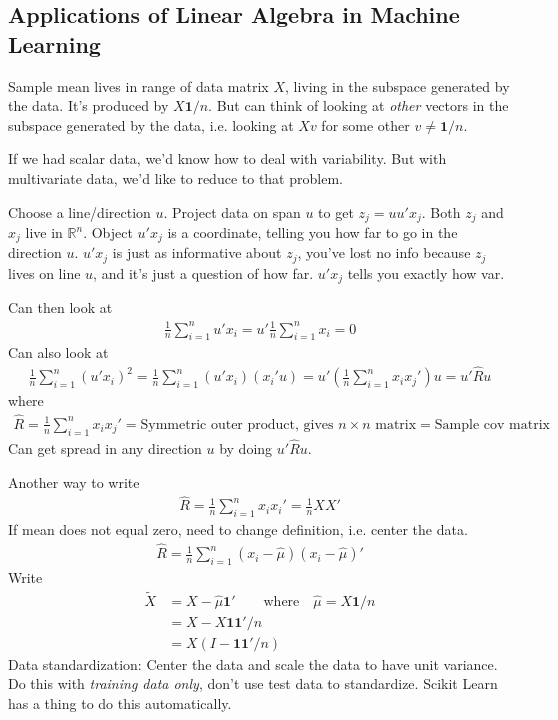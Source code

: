 \documentclass[12pt]{book}
\numberwithin{equation}{section} %
\theoremstyle{plain}
\theoremstyle{definition}
\theoremstyle{remark}
\newcommand{\R}{\mathbb{R}}
\newcommand{\sumin}{\sum^n_{i=1}}
\begin{document}
\clearpage
\subsection{Applications of Linear Algebra in Machine Learning}

Sample mean lives in range of data matrix $X$, living in the subspace
generated by the data.
It's produced by $X\mathbf{1}/n$.
But can think of looking at \emph{other} vectors in the subspace
generated by the data, i.e. looking at $Xv$ for some other
$v\neq \mathbf{1}/n$.

If we had scalar data, we'd know how to deal with variability.
But with multivariate data, we'd like to reduce to that problem.

Choose a line/direction $u$.
Project data on span $u$ to get
$z_j=uu'x_j$.
Both $z_j$ and $x_j$ live in $\R^n$.
Object $u'x_j$ is a coordinate, telling you how far to go in the
direction $u$.
$u'x_j$ is just as informative about $z_j$, you've lost no info because
$z_j$ lives on line $u$, and it's just a question of how far. $u'x_j$
tells you exactly how var.

Can then look at
\begin{align*}
  \frac{1}{n}\sumin u'x_i
  =
  u'
  \frac{1}{n}\sumin x_i
  = 0
\end{align*}
Can also look at
\begin{align*}
  \frac{1}{n}\sumin (u'x_i)^2
  =
  \frac{1}{n}\sumin (u'x_i)(x_i'u)
  =
  u'
  \left(
  \frac{1}{n}\sumin x_ix_j'
  \right)
  u
  = u' \hat{R}u
\end{align*}
where
\begin{align*}
  \hat{R}
  =
  \frac{1}{n}\sumin x_ix_j'
  =
  \text{Symmetric outer product, gives $n\times n$ matrix}
  =
  \text{Sample cov matrix}
\end{align*}
Can get spread in any direction $u$ by doing $u'\hat{R}u$.

Another way to write
\begin{align*}
  \hat{R}
  =
  \frac{1}{n}\sumin x_ix_i'
  =
  \frac{1}{n}XX'
\end{align*}
If mean does not equal zero, need to change definition, i.e. center the
data.
\begin{align*}
  \hat{R}
  =
  \frac{1}{n}\sumin (x_i-\hat{\mu})(x_i-\hat{\mu})'
\end{align*}
Write
\begin{align*}
  \tilde{X}
  &=X-\hat{\mu}\mathbf{1}'
  \qquad\text{where}\quad
  \hat{\mu}=X\mathbf{1}/n
  \\
  &=X-X\mathbf{1}\mathbf{1}'/n
  \\
  &=X(I-\mathbf{1}\mathbf{1}'/n)
\end{align*}
Data standardization: Center the data and scale the data to have unit
variance. Do this with \emph{training data only}, don't use test data to
standardize.
Scikit Learn has a thing to do this automatically.
\end{document}
